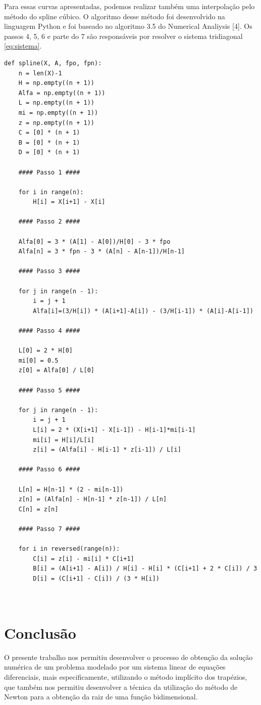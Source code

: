 \documentclass[a4paper,10pt]{article}
\begin{document}
  Para essas curvas apresentadas, podemos realizar também uma interpolação pelo método do spline cúbico.
  O algoritmo desse método foi desenvolvido na linguagem Python e foi baseado no algoritmo 3.5 do Numerical Analiysis [4]. 
  Os passos 4, 5, 6 e parte do 7 são responsáveis por resolver o sistema tridiagonal \ref{eq:sistema}.
  \begin{lstlisting}[frame=single]
   def spline(X, A, fpo, fpn):
	n = len(X)-1
	H = np.empty((n + 1))
	Alfa = np.empty((n + 1))
	L = np.empty((n + 1))
	mi = np.empty((n + 1))
	z = np.empty((n + 1))
	C = [0] * (n + 1)
	B = [0] * (n + 1)
	D = [0] * (n + 1)
	
	#### Passo 1 ####

	for i in range(n):
		H[i] = X[i+1] - X[i]
		
	#### Passo 2 ####
		
	Alfa[0] = 3 * (A[1] - A[0])/H[0] - 3 * fpo
	Alfa[n] = 3 * fpn - 3 * (A[n] - A[n-1])/H[n-1]
	
	#### Passo 3 ####

	for j in range(n - 1):
		i = j + 1
		Alfa[i]=(3/H[i]) * (A[i+1]-A[i]) - (3/H[i-1]) * (A[i]-A[i-1])
		
	#### Passo 4 ####
	
	L[0] = 2 * H[0]
	mi[0] = 0.5
	z[0] = Alfa[0] / L[0]

	#### Passo 5 ####
	
	for j in range(n - 1):
		i = j + 1
		L[i] = 2 * (X[i+1] - X[i-1]) - H[i-1]*mi[i-1]
		mi[i] = H[i]/L[i]
		z[i] = (Alfa[i] - H[i-1] * z[i-1]) / L[i]

	#### Passo 6 ####	
	
	L[n] = H[n-1] * (2 - mi[n-1])
	z[n] = (Alfa[n] - H[n-1] * z[n-1]) / L[n]
	C[n] = z[n]
	
	#### Passo 7 ####

	for i in reversed(range(n)):
		C[i] = z[i] - mi[i] * C[i+1]
		B[i] = (A[i+1] - A[i]) / H[i] - H[i] * (C[i+1] + 2 * C[i]) / 3
		D[i] = (C[i+1] - C[i]) / (3 * H[i])

	
  \end{lstlisting}

  \section{Conclusão}
  O presente trabalho nos permitiu desenvolver o processo de obtenção da solução numérica de um problema modelado por um sistema linear de equações diferenciais, mais especificamente, utilizando o método implícito dos trapézios, que também nos permitiu desenvolver a técnica da utilização do método de Newton para a obtenção da raiz de uma função bidimensional.
  
\end{document}

